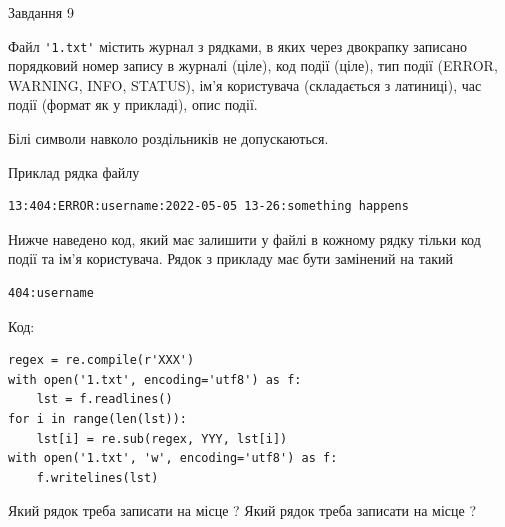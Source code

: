 \documentclass[12pt, ukrainian]{article}
\def\code#1{\Verb!#1!}
\begin{document}
{\begin{minipage}[t]{8.0cm}
\end{minipage}

               
{\begin{center}Завдання {9}\end{center}}
\vspace{-4mm}
Файл \code{'1.txt'} містить журнал з рядками, в яких через двокрапку записано поряд\-ко\-вий номер запису в журналі (ціле), код події (ціле), тип події (ERROR, \\WARNING, INFO, STATUS), ім'я користувача (складається з латиниці), час події (фор\-мат як у прикладі), опис події.

Білі символи навколо роздільників не допускаються.

Приклад рядка файлу



\begin{verbatim}
13:404:ERROR:username:2022-05-05 13-26:something happens
\end{verbatim}


Нижче наведено код, який має залишити у файлі в кожному рядку тільки код події та ім'я користувача. Рядок з прикладу має бути замінений на такий



\begin{verbatim}
404:username
\end{verbatim}




Код:



\begin{verbatim}
regex = re.compile(r'XXX')
with open('1.txt', encoding='utf8') as f:
    lst = f.readlines()
for i in range(len(lst)):
    lst[i] = re.sub(regex, YYY, lst[i])
with open('1.txt', 'w', encoding='utf8') as f:
    f.writelines(lst)
\end{verbatim}





Який рядок треба записати на місце  ?
Який рядок треба записати на місце  ?\par

}
\newpage
\end{document}
